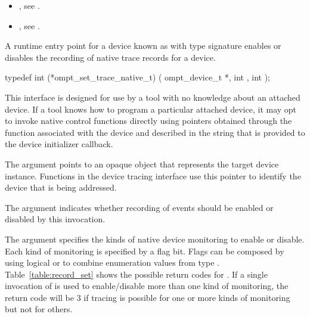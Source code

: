 \linenumbers

\crossreferences
\begin{itemize}
\item {},
see .
\item {},
see .
\end{itemize}

\label{sec:ompt_set_trace_native_t}

\summary
A runtime entry point for a device known as 
with type signature 
enables or disables the recording of native trace records for a device.


\format
\begin{ccppspecific}
\begin{omptInquiry}
typedef int (*ompt_set_trace_native_t) (
  ompt_device_t *,
  int ,
  int 
);
\end{omptInquiry}
\end{ccppspecific}

\descr
This interface is designed for use by a tool with no knowledge about
an attached device. If a tool knows how to program a particular
attached device, it may opt to invoke native control functions
directly using pointers obtained through the  function
associated with the device and described in the 
string that is provided to the device initializer callback.

\argdesc
The  argument points to an opaque object that represents
the target device instance. Functions in the device tracing interface
use this pointer to identify the device that is being addressed.

The argument  indicates whether recording of events
should be enabled or disabled by this invocation.

The argument  specifies the kinds of native device
monitoring to enable or disable.
Each kind of monitoring is specified by a flag bit.
Flags can be composed by using logical {\ttfamily or}  to combine enumeration
values from type .
Table~\ref{table:record_set} shows the possible return codes for
.  If a single invocation of
 is used to enable/disable more
than one kind of monitoring, the return code will be 3 if tracing
is possible for one or more kinds of monitoring but not for others.

